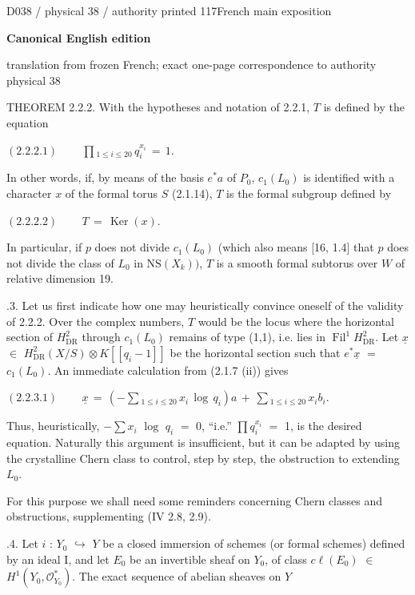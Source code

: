 \documentclass[9pt]{article}
\newcommand{\CanonText}[1]{\par{\fontsize{8.0}{9.35}\selectfont\RaggedRight #1\par}\vspace{2.2pt}}
\newcommand{\CanonDisplay}[1]{\par\vspace{1.2pt}\begin{center}{\fontsize{7.2}{8.4}\selectfont\(\displaystyle #1\)}\end{center}\vspace{1.2pt}}
\newcommand{\LayerTitle}{Canonical English edition}
\begin{document}
\noindent\begin{minipage}[t][\dimexpr\textheight-5pt\relax][t]{\textwidth}
{\sffamily\fontsize{7.3}{8.2}\selectfont\color{Quiet} D038 / physical 38 / authority printed 117\hfill French main exposition}
\par{}\vspace{4.5pt}
{\sffamily\fontsize{10.4}{11.6}\selectfont\bfseries\color{Accent} \LayerTitle}
\par{\sffamily\fontsize{6.7}{7.7}\selectfont\color{Quiet} translation from frozen French; exact one-page correspondence to authority physical 38}
\vspace{5pt}
\CanonText{THEOREM 2.2.2. With the hypotheses and notation of 2.2.1, \(T\) is defined by the equation}
\CanonDisplay{(2.2.2.1)\qquad\,\prod{}_{1\leq{}i\leq{}20}\,q_{i}^{x_{i}}\,=\,1.}
\CanonText{In other words, if, by means of the basis \(e^{*}a\) of \(P_{0}\), \(c_{1}(L_{0})\) is identified with a character \(x\) of the formal torus \(S\) (2.1.14), \(T\) is the formal subgroup defined by}
\CanonDisplay{(2.2.2.2)\qquad\,T\,=\,\operatorname{Ker}(x).}
\CanonText{In particular, if \(p\) does not divide \(c_{1}(L_{0})\) (which also means [16, 1.4] that \(p\) does not divide the class of \(L_{0}\) in \(\mathrm{NS}(X_{k}))\), \(T\) is a smooth formal subtorus over \(W\) of relative dimension 19.}
\CanonText{2.2.3. Let us first indicate how one may heuristically convince oneself of the validity of 2.2.2. Over the complex numbers, \(T\) would be the locus where the horizontal section of \(H^{2}_{\mathrm{DR}}\) through \(c_{1}(L_{0})\) remains of type (1,1), i.e. lies in \(\operatorname{Fil}^{1}H^{2}_{\mathrm{DR}}\). Let \(\underline{x}\) \(\in{}\) \(H^{2}_{\mathrm{DR}}(X/S)\otimes{}K[[q_{i}-1]]\) be the horizontal section such that \(e^{*}\underline{x}\) \(=\) \(c_{1}(L_{0})\). An immediate calculation from (2.1.7 (ii)) gives}
\CanonDisplay{(2.2.3.1)\qquad\,\underline{x}\,=\,(-\sum{}_{1\leq{}i\leq{}20}\,x_{i}\,\operatorname{log}\,q_{i})a\,+\,\sum{}_{1\leq{}i\leq{}20}\,x_{i}b_{i}.}
\CanonText{Thus, heuristically, \(-\sum{}x_{i}\) \(\operatorname{log}\) \(q_{i}\) \(=\) 0, “i.e.” \(\prod{}q_{i}^{x_{i}}\) \(=\) 1, is the desired equation. Naturally this argument is insufficient, but it can be adapted by using the crystalline Chern class to control, step by step, the obstruction to extending \(L_{0}\).}
\CanonText{For this purpose we shall need some reminders concerning Chern classes and obstructions, supplementing (IV 2.8, 2.9).}
\CanonText{2.2.4. Let \(i\) : \(Y_{0}\) \(\hookrightarrow{}\) \(Y\) be a closed immersion of schemes (or formal schemes) defined by an ideal I, and let \(E_{0}\) be an invertible sheaf on \(Y_{0}\), of class \(c\ell{}(E_{0})\) \(\in{}\) \(H^{1}(Y_{0},\mathcal{O}^{*}_{Y_{0}})\). The exact sequence of abelian sheaves on \(Y\)}

\end{minipage}
\end{document}
